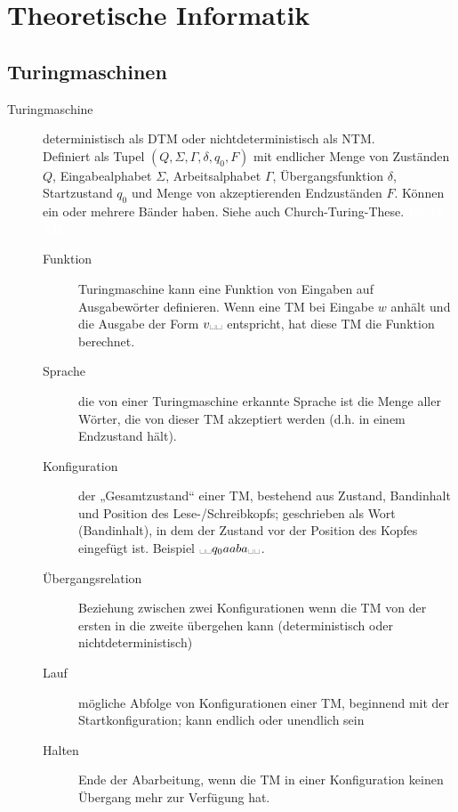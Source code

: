 \documentclass[a4paper,10pt]{article}
\newcommand{\vl}[1]{\colorbox{vl}{\textcolor{white}{\small\textbf{#1}}}}
\newcommand{\blank}{\text{\textvisiblespace}}
\begin{document}
    \newpage
    \section{Theoretische Informatik}
    \subsection{Turingmaschinen}
    \begin{description}
        \item[Turingmaschine] deterministisch als DTM oder nichtdeterministisch als NTM. \\
			Definiert als Tupel $(Q,\Sigma,\Gamma,\delta,q_0,F)$ mit endlicher Menge von Zuständen $Q$, Eingabealphabet $\Sigma$, Arbeitsalphabet $\Gamma$, Übergangsfunktion $\delta$, Startzustand $q_0$ und Menge von akzeptierenden Endzuständen $F$. Können ein oder mehrere Bänder haben. Siehe auch Church-Turing-These. \vl{FS 18} \vl{TIL 1}
			
            \begin{description}
				\item[Funktion] Turingmaschine kann eine Funktion von Eingaben auf Ausgabewörter definieren. Wenn eine TM bei Eingabe $w$ anhält und die Ausgabe der Form $v\blank\blank$ entspricht, hat diese TM die Funktion berechnet.
				\item[Sprache] die von einer Turingmaschine erkannte Sprache ist die Menge aller Wörter, die von dieser TM akzeptiert werden (d.h. in einem Endzustand hält).
				
                \item[Konfiguration]
                    der „Gesamtzustand“ einer TM, bestehend aus Zustand, Bandinhalt und Position des Lese-/Schreibkopfs;
                    geschrieben als Wort (Bandinhalt), in dem der Zustand vor der Position des Kopfes eingefügt ist. Beispiel $ \blank\blank q_0aaba \blank\blank$.
                \item[Übergangsrelation]
                    Beziehung zwischen zwei Konfigurationen wenn die TM von der ersten in die zweite übergehen kann
                    (deterministisch oder nichtdeterministisch)
                \item[Lauf] mögliche Abfolge von Konfigurationen einer TM, beginnend mit der Startkonfiguration; kann endlich oder unendlich sein
                \item[Halten] Ende der Abarbeitung, wenn die TM in einer Konfiguration keinen Übergang mehr zur Verfügung hat.
                

\end{description}
\end{description}
\end{document}
